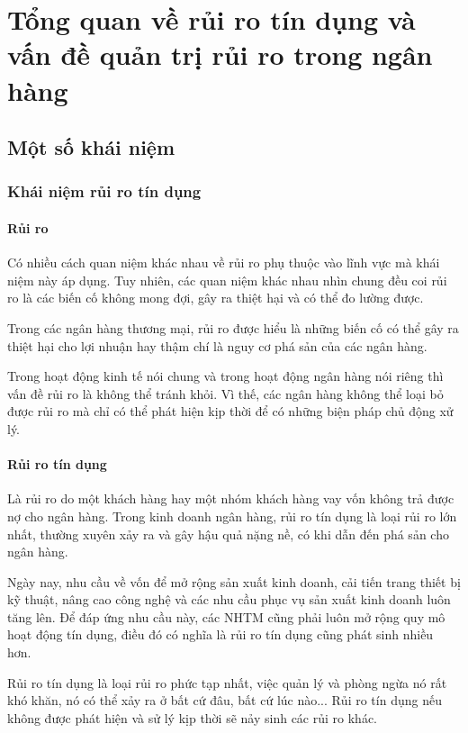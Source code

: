 \section{Tổng quan về rủi ro tín dụng và vấn đề quản trị rủi ro trong ngân hàng}
\subsection{Một số khái niệm}
\subsubsection{Khái niệm rủi ro tín dụng}
\paragraph{Rủi ro}
Có nhiều cách quan niệm khác nhau về rủi ro phụ thuộc vào lĩnh vực mà khái niệm này áp dụng.  Tuy nhiên, các quan niệm khác nhau nhìn chung đều coi rủi ro là các biến cố không mong đợi, gây ra thiệt hại và có thể đo lường được.

Trong các ngân hàng thương mại, rủi ro được hiểu là những biến cố có thể gây ra thiệt hại cho lợi nhuận hay thậm chí là nguy cơ phá sản của các ngân hàng.

Trong hoạt động kinh tế nói chung và trong hoạt động ngân hàng nói riêng thì vấn đề rủi ro là không thể tránh khỏi. Vì thế, các ngân hàng  không thể loại bỏ được rủi ro mà chỉ có thể phát hiện kịp thời để có những biện pháp chủ động xử lý.

\paragraph{Rủi ro tín dụng}
Là rủi ro do một khách hàng hay một nhóm khách hàng vay vốn không trả được nợ cho ngân hàng. Trong kinh doanh ngân hàng, rủi ro tín dụng là loại rủi ro lớn nhất, thường xuyên xảy ra và gây hậu quả nặng nề, có khi dẫn đến phá sản cho ngân hàng.

Ngày nay, nhu cầu về vốn để mở rộng sản xuất kinh doanh, cải tiến trang thiết bị kỹ thuật, nâng cao công nghệ và các nhu cầu phục vụ sản xuất kinh doanh luôn tăng lên. Để đáp ứng nhu cầu này, các NHTM cũng phải luôn mở rộng quy mô hoạt động tín dụng, điều đó có nghĩa là rủi ro tín dụng cũng phát sinh nhiều hơn.

Rủi ro tín dụng là loại rủi ro phức tạp nhất, việc quản lý và phòng ngừa nó rất khó khăn, nó có thể xảy ra ở bất cứ đâu, bất cứ lúc nào... Rủi ro tín dụng nếu không được phát hiện và sử lý kịp thời sẽ nảy sinh các rủi ro khác.

